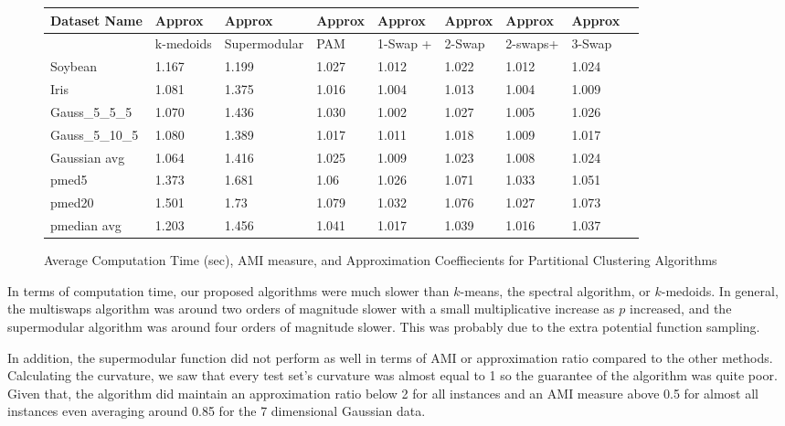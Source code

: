 \documentclass{article}
\begin{document}
\begin{figure*}[h]
\begin{tabular}{ | l | l | l | l | l | l | l | l | l | }
\hline
	Dataset Name & Approx & Approx & Approx & Approx & Approx & Approx & Approx  \\ \hline
	& k-medoids & Supermodular & PAM & 1-Swap + & 2-Swap & 2-swaps+ & 3-Swap   \\ \hline
	Soybean & 1.167 & 1.199 & 1.027 & 1.012 & 1.022 & 1.012 & 1.024 \\ 
	Iris & 1.081 & 1.375 & 1.016 & 1.004 & 1.013 & 1.004 & 1.009 \\ 
	Gauss\_5\_5\_5 & 1.070 & 1.436 & 1.030 & 1.002 & 1.027 & 1.005 & 1.026  \\ 
	Gauss\_5\_10\_5 & 1.080 & 1.389 & 1.017 & 1.011 & 1.018 & 1.009 & 1.017  \\ 
	Gaussian avg & 1.064 & 1.416 & 1.025 & 1.009 & 1.023 & 1.008 & 1.024 \\ 
	pmed5 & 1.373 & 1.681 & 1.06 & 1.026 & 1.071 & 1.033 & 1.051 \\ 
	pmed20 & 1.501 & 1.73 & 1.079 & 1.032 & 1.076 & 1.027 & 1.073 \\ 
	pmedian avg & 1.203 & 1.456 & 1.041 & 1.017 & 1.039 & 1.016 & 1.037 \\ \hline
\end{tabular}


\caption{Average Computation Time (sec), AMI measure, and Approximation Coeffiecients for Partitional Clustering Algorithms}
\end{figure*}


In terms of computation time, our proposed algorithms were much slower than $k$-means, the spectral algorithm, or $k$-medoids. In general, the multiswaps algorithm was around two orders of magnitude slower with a small multiplicative increase as $p$ increased, and the supermodular algorithm was around four orders of magnitude slower. This was probably due to the extra potential function sampling. 

In addition, the supermodular function did not perform as well in terms of AMI or approximation ratio compared to the other methods. Calculating the curvature, we saw that every  test set's curvature was almost equal to 1 so the guarantee of the algorithm was quite poor. Given that, the algorithm did maintain an approximation ratio below 2 for all instances and an AMI measure above 0.5 for almost all instances even averaging around 0.85 for the 7 dimensional Gaussian data.
\end{document}
